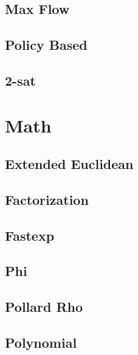 \subsection{Max Flow}
\raggedbottom
\hrulefill
\subsection{Policy Based}
\raggedbottom
\hrulefill
\subsection{2-sat}
\raggedbottom
\hrulefill

\section{Math}
\subsection{Extended Euclidean}
\raggedbottom
\hrulefill
\subsection{Factorization}
\raggedbottom
\hrulefill
\subsection{Fastexp}
\raggedbottom
\hrulefill
\subsection{Phi}
\raggedbottom
\hrulefill
\subsection{Pollard Rho}
\raggedbottom
\hrulefill
\subsection{Polynomial}
\raggedbottom
\hrulefill

